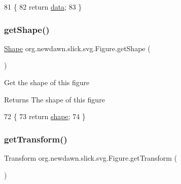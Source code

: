 \begin{DoxyCode}
81                                       \{
82         \textcolor{keywordflow}{return} \mbox{\hyperlink{classorg_1_1newdawn_1_1slick_1_1svg_1_1_figure_a31e90c8351882640950687c7e8587091}{data}};
83     \}
\end{DoxyCode}
\mbox{\label{classorg_1_1newdawn_1_1slick_1_1svg_1_1_figure_a980b7a979c218c2a73897ba47a2b3a17}} 
\subsubsection{\texorpdfstring{get\+Shape()}{getShape()}}
{\footnotesize\ttfamily \mbox{\hyperlink{classorg_1_1newdawn_1_1slick_1_1geom_1_1_shape}{Shape}} org.\+newdawn.\+slick.\+svg.\+Figure.\+get\+Shape (\begin{DoxyParamCaption}{ }\end{DoxyParamCaption})\hspace{0.3cm}{\ttfamily [inline]}}

Get the shape of this figure

\begin{DoxyReturn}{Returns}
The shape of this figure 
\end{DoxyReturn}

\begin{DoxyCode}
72                             \{
73         \textcolor{keywordflow}{return} \mbox{\hyperlink{classorg_1_1newdawn_1_1slick_1_1svg_1_1_figure_a8f61c893d97589c745d42f6146d8670e}{shape}};
74     \}
\end{DoxyCode}
\mbox{\label{classorg_1_1newdawn_1_1slick_1_1svg_1_1_figure_a407e6b796ef1ee5b6cd2ce29c9a72464}} 
\subsubsection{\texorpdfstring{get\+Transform()}{getTransform()}}
{\footnotesize\ttfamily Transform org.\+newdawn.\+slick.\+svg.\+Figure.\+get\+Transform (\begin{DoxyParamCaption}{ }\end{DoxyParamCaption})\hspace{0.3cm}{\ttfamily [inline]}}

